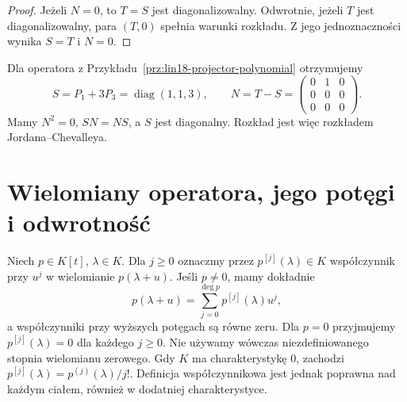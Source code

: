 \begin{proof}
Jeżeli \(N=0\), to \(T=S\)
jest diagonalizowalny.
Odwrotnie, jeżeli \(T\) jest diagonalizowalny,
para \((T,0)\) spełnia warunki rozkładu.
Z jego jednoznaczności wynika \(S=T\) i \(N=0\).
\end{proof}

\begin{przyklad}
\label{prz:lin18-chevalley-example}
Dla operatora z
Przykładu~\ref{prz:lin18-projector-polynomial}
otrzymujemy
\[
 S=P_1+3P_3
   =\operatorname{diag}(1,1,3),
 \qquad
 N=T-S=
 \begin{pmatrix}
 0&1&0\\0&0&0\\0&0&0
 \end{pmatrix}.
\]
Mamy \(N^2=0\), \(SN=NS\),
a \(S\) jest diagonalny.
Rozkład jest więc rozkładem
Jordana--Chevalleya.
\end{przyklad}

\section{Wielomiany operatora, jego potęgi i odwrotność}
\label{sec:lin18-polynomial-calculus}

\begin{definicja}
\label{def:lin18-taylor-coefficients}
Niech \(p\in K[t]\), \(\lambda\in K\).
Dla \(j\ge0\) oznaczmy przez
\(p^{[j]}(\lambda)\in K\)
współczynnik przy \(u^j\)
w wielomianie \(p(\lambda+u)\).
Jeśli \(p\ne0\), mamy dokładnie
\[
 p(\lambda+u)
   =\sum_{j=0}^{\deg p}p^{[j]}(\lambda)u^j,
\]
a współczynniki przy wyższych potęgach
są równe zeru.
Dla \(p=0\) przyjmujemy
\(p^{[j]}(\lambda)=0\) dla każdego \(j\ge0\).
Nie używamy wówczas niezdefiniowanego
stopnia wielomianu zerowego.
Gdy \(K\) ma charakterystykę \(0\),
zachodzi \(p^{[j]}(\lambda)=p^{(j)}(\lambda)/j!\).
Definicja współczynnikowa
jest jednak poprawna nad każdym ciałem,
również w dodatniej charakterystyce.
\end{definicja}

